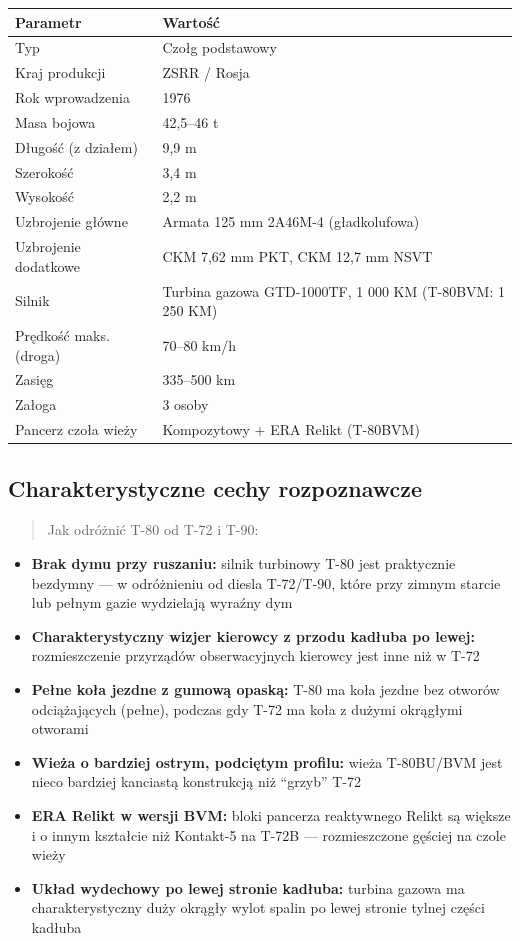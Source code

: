 \documentclass[12pt,oneside]{book}
\providecommand{\tightlist}{%
  \setlength{\itemsep}{0pt}\setlength{\parskip}{0pt}}
\begin{document}
\begin{longtable}[]{@{}ll@{}}
\toprule\noalign{}
Parametr & Wartość \\
\midrule\noalign{}
\endhead
\bottomrule\noalign{}
\endlastfoot
Typ & Czołg podstawowy \\
Kraj produkcji & ZSRR / Rosja \\
Rok wprowadzenia & 1976 \\
Masa bojowa & 42,5--46 t \\
Długość (z działem) & 9,9 m \\
Szerokość & 3,4 m \\
Wysokość & 2,2 m \\
Uzbrojenie główne & Armata 125 mm 2A46M-4 (gładkolufowa) \\
Uzbrojenie dodatkowe & CKM 7,62 mm PKT, CKM 12,7 mm NSVT \\
Silnik & Turbina gazowa GTD-1000TF, 1 000 KM (T-80BVM: 1 250 KM) \\
Prędkość maks. (droga) & 70--80 km/h \\
Zasięg & 335--500 km \\
Załoga & 3 osoby \\
Pancerz czoła wieży & Kompozytowy + ERA Relikt (T-80BVM) \\
\end{longtable}

\subsection{Charakterystyczne cechy
rozpoznawcze}\label{charakterystyczne-cechy-rozpoznawcze-4}

\begin{quote}
Jak odróżnić T-80 od T-72 i T-90:
\end{quote}

\begin{itemize}
\tightlist
\item
  \textbf{Brak dymu przy ruszaniu:} silnik turbinowy T-80 jest
  praktycznie bezdymny --- w odróżnieniu od diesla T-72/T-90, które przy
  zimnym starcie lub pełnym gazie wydzielają wyraźny dym
\item
  \textbf{Charakterystyczny wizjer kierowcy z przodu kadłuba po lewej:}
  rozmieszczenie przyrządów obserwacyjnych kierowcy jest inne niż w T-72
\item
  \textbf{Pełne koła jezdne z gumową opaską:} T-80 ma koła jezdne bez
  otworów odciążających (pełne), podczas gdy T-72 ma koła z dużymi
  okrągłymi otworami
\item
  \textbf{Wieża o bardziej ostrym, podciętym profilu:} wieża T-80BU/BVM
  jest nieco bardziej kanciastą konstrukcją niż ``grzyb'' T-72
\item
  \textbf{ERA Relikt w wersji BVM:} bloki pancerza reaktywnego Relikt są
  większe i o innym kształcie niż Kontakt-5 na T-72B --- rozmieszczone
  gęściej na czole wieży
\item
  \textbf{Układ wydechowy po lewej stronie kadłuba:} turbina gazowa ma
  charakterystyczny duży okrągły wylot spalin po lewej stronie tylnej
  części kadłuba
\end{itemize}
\end{document}
